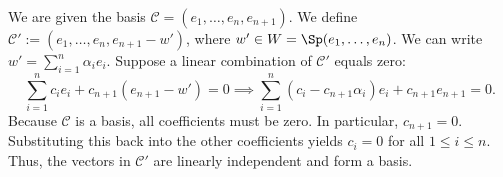\begin{exercisesolution}
\label{sol:shifted_family_is_basis}
We are given the basis $\mathcal{C} = (e_1, \dots, e_n, e_{n+1})$. We define $\mathcal{C}' := (e_1, \dots, e_n, e_{n+1} - w')$, where $w' \in W = \Sp(e_1, \dots, e_n)$. We can write $w' = \sum_{i=1}^n \alpha_i e_i$. 
Suppose a linear combination of $\mathcal{C}'$ equals zero:
\[
\sum_{i=1}^n c_i e_i + c_{n+1}(e_{n+1} - w') = 0 \implies \sum_{i=1}^n (c_i - c_{n+1}\alpha_i) e_i + c_{n+1} e_{n+1} = 0.
\]
Because $\mathcal{C}$ is a basis, all coefficients must be zero. In particular, $c_{n+1} = 0$. Substituting this back into the other coefficients yields $c_i = 0$ for all $1 \le i \le n$. Thus, the vectors in $\mathcal{C}'$ are linearly independent and form a basis.
\end{exercisesolution}

